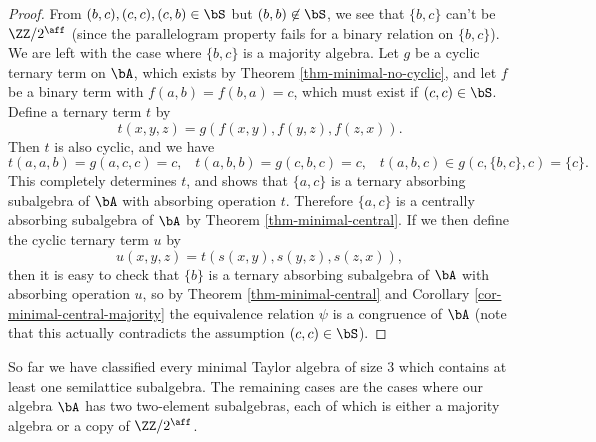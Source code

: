 \begin{proof}
From $(b,c), (c,c), (c,b) \in \bS$ but $(b,b) \not\in \bS$, we see that $\{b,c\}$ can't be $\ZZ/2^{\aff}$ (since the parallelogram property fails for a binary relation on $\{b,c\}$). We are left with the case where $\{b,c\}$ is a majority algebra. Let $g$ be a cyclic ternary term on $\bA$, which exists by Theorem \ref{thm-minimal-no-cyclic}, and let $f$ be a binary term with $f(a,b) = f(b,a) = c$, which must exist if $(c,c) \in \bS$. Define a ternary term $t$ by
\[
t(x,y,z) = g(f(x,y), f(y,z), f(z,x)).
\]
Then $t$ is also cyclic, and we have
\[
t(a,a,b) = g(a,c,c) = c, \;\;\; t(a,b,b) = g(c,b,c) = c, \;\;\; t(a,b,c) \in g(c,\{b,c\},c) = \{c\}.
\]
This completely determines $t$, and shows that $\{a,c\}$ is a ternary absorbing subalgebra of $\bA$ with absorbing operation $t$. Therefore $\{a,c\}$ is a centrally absorbing subalgebra of $\bA$ by Theorem \ref{thm-minimal-central}. If we then define the cyclic ternary term $u$ by
\[
u(x,y,z) = t(s(x,y), s(y,z), s(z,x)),
\]
then it is easy to check that $\{b\}$ is a ternary absorbing subalgebra of $\bA$ with absorbing operation $u$, so by Theorem \ref{thm-minimal-central} and Corollary \ref{cor-minimal-central-majority} the equivalence relation $\psi$ is a congruence of $\bA$ (note that this actually contradicts the assumption $(c,c) \in \bS$).
\end{proof}

So far we have classified every minimal Taylor algebra of size $3$ which contains at least one semilattice subalgebra. The remaining cases are the cases where our algebra $\bA$ has two two-element subalgebras, each of which is either a majority algebra or a copy of $\ZZ/2^{\aff}$.

